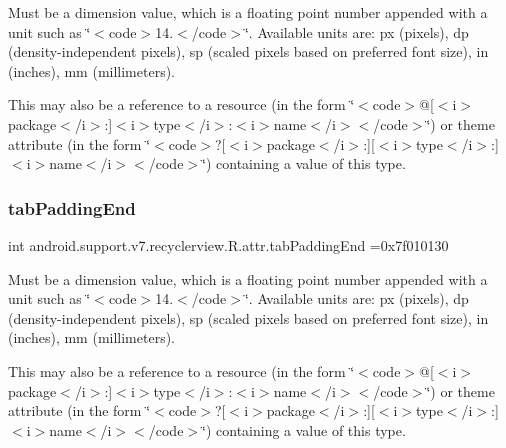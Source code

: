 Must be a dimension value, which is a floating point number appended with a unit such as \char`\"{}$<$code$>$14.\+5sp$<$/code$>$\char`\"{}. Available units are\+: px (pixels), dp (density-\/independent pixels), sp (scaled pixels based on preferred font size), in (inches), mm (millimeters). 

This may also be a reference to a resource (in the form \char`\"{}$<$code$>$@\mbox{[}$<$i$>$package$<$/i$>$\+:\mbox{]}$<$i$>$type$<$/i$>$\+:$<$i$>$name$<$/i$>$$<$/code$>$\char`\"{}) or theme attribute (in the form \char`\"{}$<$code$>$?\mbox{[}$<$i$>$package$<$/i$>$\+:\mbox{]}\mbox{[}$<$i$>$type$<$/i$>$\+:\mbox{]}$<$i$>$name$<$/i$>$$<$/code$>$\char`\"{}) containing a value of this type. \mbox{\label{classandroid_1_1support_1_1v7_1_1recyclerview_1_1R_1_1attr_adc9460668cb89e53acbdd0c1ae610a46}} 
\subsubsection{\texorpdfstring{tab\+Padding\+End}{tabPaddingEnd}}
{\footnotesize\ttfamily int android.\+support.\+v7.\+recyclerview.\+R.\+attr.\+tab\+Padding\+End =0x7f010130\hspace{0.3cm}{\ttfamily [static]}}

Must be a dimension value, which is a floating point number appended with a unit such as \char`\"{}$<$code$>$14.\+5sp$<$/code$>$\char`\"{}. Available units are\+: px (pixels), dp (density-\/independent pixels), sp (scaled pixels based on preferred font size), in (inches), mm (millimeters). 

This may also be a reference to a resource (in the form \char`\"{}$<$code$>$@\mbox{[}$<$i$>$package$<$/i$>$\+:\mbox{]}$<$i$>$type$<$/i$>$\+:$<$i$>$name$<$/i$>$$<$/code$>$\char`\"{}) or theme attribute (in the form \char`\"{}$<$code$>$?\mbox{[}$<$i$>$package$<$/i$>$\+:\mbox{]}\mbox{[}$<$i$>$type$<$/i$>$\+:\mbox{]}$<$i$>$name$<$/i$>$$<$/code$>$\char`\"{}) containing a value of this type. \mbox{\label{classandroid_1_1support_1_1v7_1_1recyclerview_1_1R_1_1attr_a6b9a1d5b325240f7cb1d059be120e899}} 
